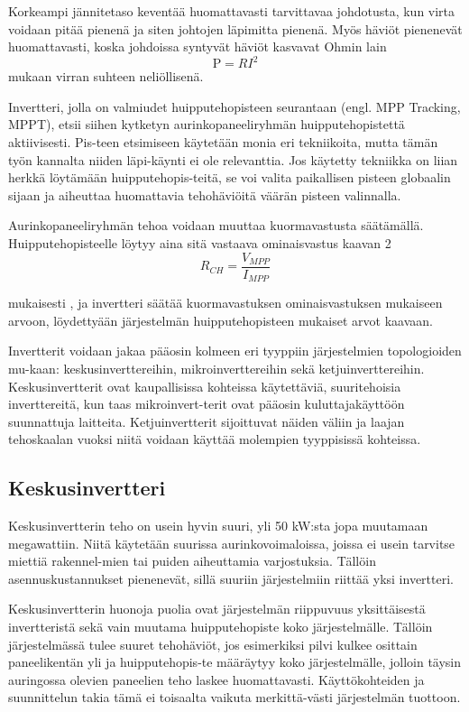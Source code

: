   Korkeampi jännitetaso keventää huomattavasti tarvittavaa johdotusta, kun virta voidaan pitää pienenä ja siten johtojen läpimitta pienenä. Myös häviöt pienenevät huomattavasti, koska johdoissa syntyvät häviöt kasvavat Ohmin lain
  \begin{equation}
    \textrm{P} = RI^2
  \end{equation}
  mukaan virran suhteen neliöllisenä.

  Invertteri, jolla on valmiudet huipputehopisteen seurantaan (engl. MPP Tracking, MPPT), etsii siihen kytketyn aurinkopaneeliryhmän huipputehopistettä aktiivisesti. Pis-teen etsimiseen käytetään monia eri tekniikoita, mutta tämän työn kannalta niiden läpi-käynti ei ole relevanttia. Jos käytetty tekniikka on liian herkkä löytämään huipputehopis-teitä, se voi valita paikallisen pisteen globaalin sijaan ja aiheuttaa huomattavia tehohäviöitä väärän pisteen valinnalla. \parencite{Joshi&Arora}

  Aurinkopaneeliryhmän tehoa voidaan muuttaa kuormavastusta säätämällä. Huipputehopisteelle löytyy aina sitä vastaava ominaisvastus kaavan 2
  \begin{equation}
    R_{CH} = \frac{V_{MPP}}{I_{MPP}}
  \end{equation}

  mukaisesti \parencite{Joshi&Arora}, ja invertteri säätää kuormavastuksen ominaisvastuksen mukaiseen arvoon, löydettyään järjestelmän huipputehopisteen mukaiset arvot kaavaan.

  Invertterit voidaan jakaa pääosin kolmeen eri tyyppiin järjestelmien topologioiden mu-kaan: keskusinverttereihin, mikroinverttereihin sekä ketjuinverttereihin. Keskusinvertterit ovat kaupallisissa kohteissa käytettäviä, suuritehoisia inverttereitä, kun taas mikroinvert-terit ovat pääosin kuluttajakäyttöön suunnattuja laitteita. Ketjuinvertterit sijoittuvat näiden väliin ja laajan tehoskaalan vuoksi niitä voidaan käyttää molempien tyyppisissä kohteissa.

\subsection{Keskusinvertteri}
  Keskusinvertterin teho on usein hyvin suuri, yli 50 kW:sta jopa muutamaan megawattiin. Niitä käytetään suurissa aurinkovoimaloissa, joissa ei usein tarvitse miettiä rakennel-mien tai puiden aiheuttamia varjostuksia. Tällöin asennuskustannukset pienenevät, sillä suuriin järjestelmiin riittää yksi invertteri.

  Keskusinvertterin huonoja puolia ovat järjestelmän riippuvuus yksittäisestä invertteristä sekä vain muutama huipputehopiste koko järjestelmälle. Tällöin järjestelmässä tulee suuret tehohäviöt, jos esimerkiksi pilvi kulkee osittain paneelikentän yli ja huipputehopis-te määräytyy koko järjestelmälle, jolloin täysin auringossa olevien paneelien teho laskee huomattavasti. Käyttökohteiden ja suunnittelun takia tämä ei toisaalta vaikuta merkittä-västi järjestelmän tuottoon.

